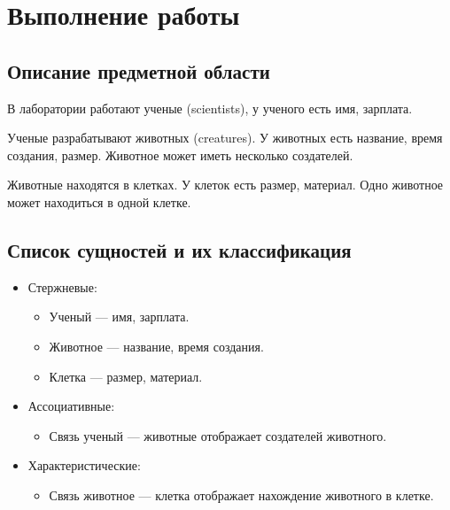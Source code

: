 \section{Выполнение работы}
\subsection{Описание предметной области}
В лаборатории работают ученые (scientists),
у ученого есть имя, зарплата.

Ученые разрабатывают животных (creatures).
У животных есть название, время создания, размер.
Животное может иметь несколько создателей.

Животные находятся в клетках.
У клеток есть размер, материал.
Одно животное может находиться в одной клетке.

\subsection{Список сущностей и их классификация}
\begin{itemize}
    \item Стержневые:
          \begin{itemize}
              \item Ученый --- имя, зарплата.
              \item Животное --- название, время создания.
              \item Клетка --- размер, материал.
          \end{itemize}
    \item Ассоциативные:
          \begin{itemize}
            \item Связь ученый --- животные отображает создателей животного.
          \end{itemize}
    \item Характеристические:
          \begin{itemize}
            \item Связь животное --- клетка отображает нахождение животного в клетке.
          \end{itemize}
\end{itemize}


